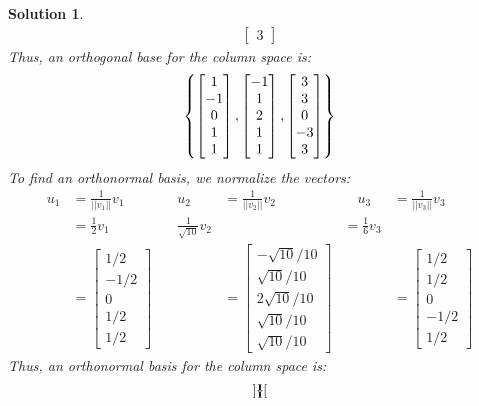 \documentclass[11pt]{scrartcl}
\theoremstyle{dotlessP}
\newtheorem{sol}{Solution}[section]
\theoremstyle{dotlessN}
\DeclarePairedDelimiter\set{\{}{\}}
\begin{document}
\begin{sol}
\begin{align*}
\begin{bmatrix}
			3
		\end{bmatrix}
\end{align*}
Thus, an orthogonal base for the column space is:
\[
	\set*{
\begin{bmatrix}
	1 \\
	-1 \\
	0 \\
	1 \\
	1
\end{bmatrix},
\begin{bmatrix}
	-1 \\
	1 \\
	2 \\
	1 \\
	1
\end{bmatrix},
\begin{bmatrix}
	3 \\
	3 \\
	0 \\
	-3 \\
	3
\end{bmatrix}
	}
\] 
To find an orthonormal basis, we normalize the vectors:
\begin{align*}
	u_1 &= \frac{1}{||v_1||}v_1 &\quad u_2 &= \frac{1}{||v_2||}v_2 &\quad u_3 &= \frac{1}{||v_3||}v_3 \\ 
		&= \frac{1}{2}v_1 &\quad \frac{1}{\sqrt{10}}v_2 &\quad &= \frac{1}{6}v_3 \\
		&= 
		\begin{bmatrix}
			1/2 \\
			-1/2 \\
			0 \\
				1/2 \\
		1/2 
	\end{bmatrix} &\quad &= 
	\begin{bmatrix}
		-\sqrt{10}/10 \\
		\sqrt{10}/10 \\
2\sqrt{10}/10 \\
\sqrt{10}/10\\ 
\sqrt{10}/10
\end{bmatrix} &\quad &=
\begin{bmatrix}
	1/2 \\
	1/2 \\
	0 \\
	-1/2 \\
	1/2
\end{bmatrix}
\end{align*}
Thus, an orthonormal basis for the column space is:
\[
	\set*{
		\begin{bmatrix}

\end{bmatrix}}\]
\end{sol}
\end{document}
